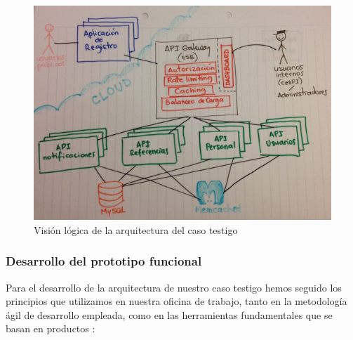 \begin{figure}
  \includegraphics[width=\linewidth]{src/images/05-capitulo-5/arquitectura-caso-testigo.jpg}
  \caption{Visión lógica de la arquitectura del caso testigo}
  \label{fig:arquitectura-caso-testigo}
\end{figure}

\subsubsection{Desarrollo del prototipo funcional}

Para el desarrollo de la arquitectura de nuestro caso testigo hemos seguido los principios que utilizamos en nuestra oficina de trabajo, tanto en la metodología ágil de desarrollo empleada, como en las herramientas fundamentales que se basan en productos :

